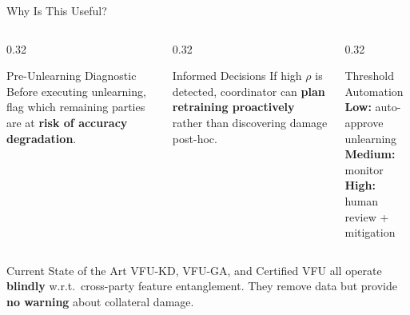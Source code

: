 \documentclass[aspectratio=169, 11pt]{beamer}
\begin{document}
\begin{frame}{Why Is This Useful?}
  \begin{columns}[T]
    \begin{column}{0.32\textwidth}
      \begin{block}{Pre-Unlearning Diagnostic}
        Before executing unlearning, flag which remaining parties are at \textbf{risk of accuracy degradation}.
      \end{block}
    \end{column}
    \begin{column}{0.32\textwidth}
      \begin{block}{Informed Decisions}
        If high $\rho$ is detected, coordinator can \textbf{plan retraining proactively} rather than discovering damage post-hoc.
      \end{block}
    \end{column}
    \begin{column}{0.32\textwidth}
      \begin{block}{Threshold Automation}
        \textbf{Low:} auto-approve unlearning\\
        \textbf{Medium:} monitor\\
        \textbf{High:} human review + mitigation
      \end{block}
    \end{column}
  \end{columns}

  \vspace{0.4cm}
  \begin{exampleblock}{Current State of the Art}
    VFU-KD, VFU-GA, and Certified VFU all operate \textbf{blindly} w.r.t.\ cross-party feature entanglement. They remove data but provide \textbf{no warning} about collateral damage.
  \end{exampleblock}
\end{frame}
\end{document}
